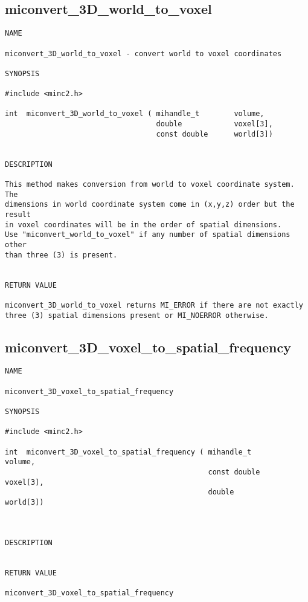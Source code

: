 \documentclass{article}
\begin{document}
\subsection{miconvert\_3D\_world\_to\_voxel}
\begin{verbatim}
NAME 

miconvert_3D_world_to_voxel - convert world to voxel coordinates

SYNOPSIS

#include <minc2.h>

int  miconvert_3D_world_to_voxel ( mihandle_t        volume,
                                   double            voxel[3],
                                   const double      world[3])
                       
                                
DESCRIPTION

This method makes conversion from world to voxel coordinate system. The
dimensions in world coordinate system come in (x,y,z) order but the result  
in voxel coordinates will be in the order of spatial dimensions. 
Use "miconvert_world_to_voxel" if any number of spatial dimensions other
than three (3) is present.


RETURN VALUE

miconvert_3D_world_to_voxel returns MI_ERROR if there are not exactly
three (3) spatial dimensions present or MI_NOERROR otherwise.
\end{verbatim}

\subsection{miconvert\_3D\_voxel\_to\_spatial\_frequency}
\begin{verbatim}
NAME 

miconvert_3D_voxel_to_spatial_frequency

SYNOPSIS

#include <minc2.h>

int  miconvert_3D_voxel_to_spatial_frequency ( mihandle_t            volume,
                                               const double          voxel[3],
                                               double                world[3])
                                   
                       
                                
DESCRIPTION


RETURN VALUE

miconvert_3D_voxel_to_spatial_frequency
\end{verbatim}
\end{document}

